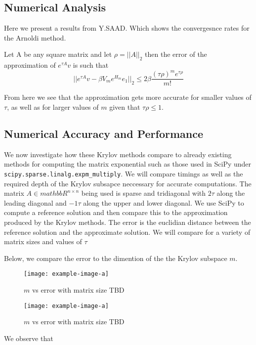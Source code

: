 \subsection{Numerical Analysis}
Here we present a results from Y.SAAD\cite{Saad1992}. Which shows the convergesnce rates for the Arnoldi method.

\begin{theorem}
    Let A be any square matrix and let \(\rho=||A||_2\) then the error of the approximation of \(e^{\tau A}v\) is such that
    \[ ||e^{\tau A}v - \beta V_m e^{H_m}e_1||_2 \leq 2\beta \frac{(\tau \rho)^m e^{\tau \rho}}{m!} \]
\end{theorem}
From here we see that the approximation gets more accurate for smaller values of $\tau$, as well as for larger values of $m$ given that $\tau \rho\leq1$.

\subsection{Numerical Accuracy and Performance}
We now investigate how these Krylov methods compare to already existing methods for computing the matrix exponential such as those used in SciPy under \verb|scipy.sparse.linalg.expm_multiply|\cite{AlMohy2011}\cite{Higham2010}.
We will compare timings as well as the required depth of the Krylov subsapce neccessary for accurate computations.
The matrix $A \in mathbb{R}^{n \times n}$ being used is sparse and tridiagonal with $2\tau$ along the leading diagonal and $-1\tau$ along the upper and lower diagonal.
We use SciPy to compute a reference solution and then compare this to the approximation produced by the Krylov methods.
The error is the euclidian distance between the reference solution and the approximate solution.
We will compare for a variety of matrix sizes and values of $\tau$

Below, we compare the error to the dimention of the the Krylov subspace $m$.
\begin{figure}[H]
    \centering
    \begin{minipage}{0.49\textwidth}
        \texttt{[image: example-image-a]} %
        \caption{$m$ vs error with matrix size TBD}
        \label{fig:mEKrylov1}
    \end{minipage}\hfill
    \centering
    \begin{minipage}{0.49\textwidth}
        \texttt{[image: example-image-a]} %
        \caption{$m$ vs error with matrix size TBD}
        \label{fig:mEKrylov2}
    \end{minipage}\hfill
\end{figure}
We observe that 

